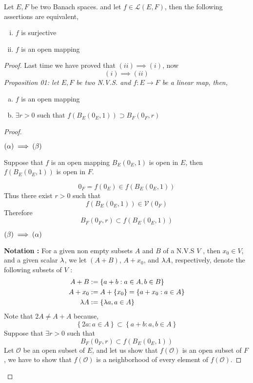 \lecday[2025-04-17]

% 

\begin{theorem}
	Let $E,F $  be two Banach spaces. and let 
	$f \in  \mathcal{L} (E,F)  $, then the following 
	assertions are equivalent, 
	\begin{enumerate}[(i)]
	\item  $f $ is surjective
	\item $f $ is an open mapping  
	\end{enumerate}
\end{theorem}
\begin{proof}
Last time we have proved that $(ii) \implies  (i)$, now 
\[
	(i)  \implies (ii) 
\]
\divider
\it Proposition 01: \normalfont let $E,F $  be two N.V.S. and 
$ f : E \longrightarrow F $  be a linear map, then, 
\begin{enumerate}[(a)]
\item  $f $ is an open mapping
\item $\exists r > 0 $ such that $f \left( B_{E}(0_{E}, 1)  \right) 
	\supset  B_{F}(0_{F},r) $  
\end{enumerate}
\begin{proof}
	\begin{center}
		$(\alpha)  \implies  (\beta)  $ 
	\end{center}
Suppose that $f $ is an open mapping $B_{E}(0_{E},1)  $  
is open in $E $, then $f(B_{E}(0_{E},1) )  $  is open in $F$.

\[
0_{F} = f(0_{E})  \in  f(B_{E}(0_{E},1) )  
\]
Thus there exist $r > 0 $  such that 
\[
	f (B_{E}(0_{E},1) )  \in 
	\mathcal{V} (0_{F}) 
\]
Therefore 
\[ 
	B_{F}(0_{F}, r)  \subset f(B_{E}(0_{E}, 1)) 
\]
\begin{center}
	$(\beta)  \implies  (\alpha)  $ 
\end{center}
\textbf{Notation : } For a given non empty subsets $A $ and 
$B $ of a N.V.S $V$ , then $x_0 \in V $, and a given scalar $\lambda $, 
we let $(A+B) $, $A+x_0 $, and $\lambda A $, respectively, denote the following 
subsets of $V $ : 
\begin{align*}
	A + B &:= \left\{ a+b: a \in A, b \in  B  \right\} \\
	A+x_0 &:= A + \left\{ x_0 \right\} = 
	\left\{ a + x_0: a \in  A \right\}
\\
	\lambda A &:= 
	\left\{ \lambda a, a \in A \right\}
\end{align*}
Note that $2A \neq  A+A $ because, 
\[
\left\{ 2a: a \in A \right\} \subset 
\left\{ a+b: a,b \in  A \right\}
\]
Suppose that $\exists  r > 0$  such that 
\[
B_{F}(0_{F},r) \subset f(B_{E}(0_{E},1) )  
\]
Let $\mathcal{O}  $  be an open subset of $E $, and let us show
that $f(\mathcal{O} )  $  is an open subset of $F $, we have to show that 
$f(\mathcal{O} )  $  is a neighborhood of every element of $f(\mathcal{O} )  $.


\end{proof}
\end{proof}
